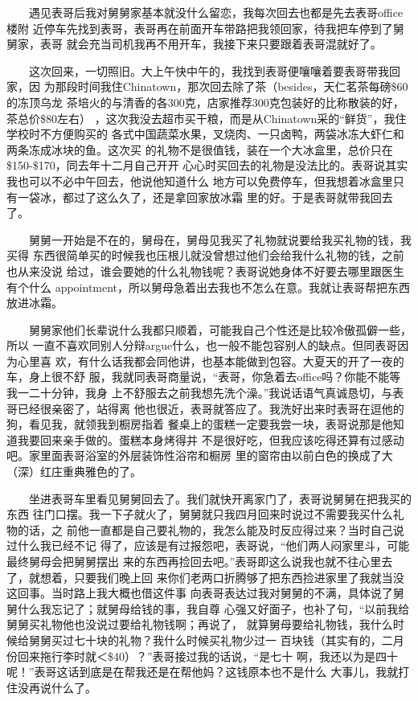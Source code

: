 \documentclass[12pt]{book}
\begin{document}
　　遇见表哥后我对舅舅家基本就没什么留恋，我每次回去也都是先去表哥office楼附
近停车先找到表哥，表哥再在前面开车带路把我领回家，待我把车停到了舅舅家，表哥
就会充当司机我再不用开车，我接下来只要跟着表哥混就好了。

　　这次回来，一切照旧。大上午快中午的，我找到表哥便嚷嚷着要表哥带我回家，因
为那段时间我住Chinatown，那次回去除了茶（besides，天仁茗茶每磅\$60的冻顶乌龙
茶培火的与清香的各300克，店家推荐300克包装好的比称散装的好，茶总价\$80左右）
，这次我没去超市买干粮，而是从Chinatown采的“鲜货”，我住学校时不方便购买的
各式中国蔬菜水果，叉烧肉、一只卤鸭，两袋冰冻大虾仁和两条冻成冰块的鱼。这次买
的礼物不是很值钱，装在一个大冰盒里，总价只在\$150-\$170，同去年十二月自己开开
心心时买回去的礼物是没法比的。表哥说其实我也可以不必中午回去，他说他知道什么
地方可以免费停车，但我想着冰盒里只有一袋冰，都过了这么久了，还是拿回家放冰霜
里的好。于是表哥就带我回去了。

　　舅舅一开始是不在的，舅母在，舅母见我买了礼物就说要给我买礼物的钱，我买得
东西很简单买的时候我也压根儿就没曾想过他们会给我什么礼物的钱，之前也从来没说
给过，谁会要她的什么礼物钱呢？表哥说她身体不好要去哪里跟医生有个什么
appointment，所以舅母急着出去我也不怎么在意。我就让表哥帮把东西放进冰霜。

　　舅舅家他们长辈说什么我都只顺着，可能我自己个性还是比较冷傲孤僻一些，所以
一直不喜欢同别人分辩argue什么，也一般不能包容别人的缺点。但同表哥因为心里喜
欢，有什么话我都会同他讲，也基本能做到包容。大夏天的开了一夜的车，身上很不舒
服，我就同表哥商量说，“表哥，你急着去office吗？你能不能等我一二十分钟，我身
上不舒服去之前我想先洗个澡。”我说话语气真诚恳切，与表哥已经很亲密了，站得离
他也很近，表哥就答应了。我洗好出来时表哥在逗他的狗，看见我，就领我到橱房指着
餐桌上的蛋糕一定要我尝一块，表哥说那是他知道我要回来亲手做的。蛋糕本身烤得并
不是很好吃，但我应该吃得还算有过感动吧。家里面表哥浴室的外层装饰性浴帘和橱房
里的窗帘由以前白色的换成了大（深）红庄重典雅色的了。

　　坐进表哥车里看见舅舅回去了。我们就快开离家门了，表哥说舅舅在把我买的东西
往门口摆。我一下子就火了，舅舅就只我四月回来时说过不需要我买什么礼物的话，之
前他一直都是自己要礼物的，我怎么能及时反应得过来？当时自己说过什么我已经不记
得了，应该是有过报怨吧，表哥说，“他们两人闷家里斗，可能最终舅母会把舅舅摆出
来的东西再捡回去吧。”表哥即这么说我也就不往心里去了，就想着，只要我们晚上回
来你们老两口折腾够了把东西捡进家里了我就当没这回事。当时路上我大概也借这件事
向表哥表达过我对舅舅的不满，具体说了舅舅什么我忘记了；就舅母给钱的事，我自尊
心强又好面子，也补了句，“以前我给舅舅买礼物他也没说过要给礼物钱啊；再说了，
就算舅母要给礼物钱，我什么时候给舅舅买过七十块的礼物？我什么时候买礼物少过一
百块钱（其实有的，二月份回来拖行李时就＜\$40）？”表哥接过我的话说，“是七十
啊，我还以为是四十呢！”表哥这话到底是在帮我还是在帮他妈？这钱原本也不是什么
大事儿，我就打住没再说什么了。
\end{document}
